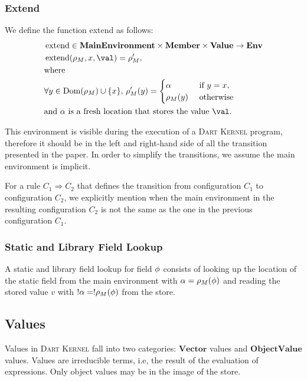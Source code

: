 \documentclass[a4paper,oneside,fleqn]{article}
\newcommand{\kernel}{\textsc{Dart Kernel}}
\DeclareMathOperator{\dom}{Dom} %
\DeclareMathOperator{\extend}{extend}
\newcommand{\denv}{\mathbf{Env}}
\newcommand{\dval}{\mathbf{Value}}
\newcommand{\dobjval}{\mathbf{ObjectValue}}
\newcommand{\dvector}{\mathbf{Vector}}
\newcommand{\dmember}{\mathbf{Member}}
\begin{document}
\subsubsection{Extend}
We define the function extend as follows:
\begin{align*}
    &\extend \in \dmainenv \times \dmember \times \dval \rightarrow \denv\\
    &\extend(\mainenv, x, \val) = \mainenv',\\
    &\text{where }\\
    &\forall y \in \dom(\mainenv) \cup \{x\},\,\mainenv'(y) =\begin{cases}
        \loc &\text{ if } y = x,\\
        \mainenv(y) &\text{ otherwise}\\
    \end{cases}\\
    &\text{and $\loc$ is a fresh location that stores the value $\val$.}
\end{align*}

This environment is visible during the execution of a \kernel{} program, therefore it should be in the left and right-hand side of all the transition presented in the paper.
In order to simplify the transitions, we assume the main environment is implicit.

For a rule $C_1 \Rightarrow C_2$ that defines the transition from configuration $C_1$ to configuration $C_2$, we explicitly mention when the main environment in the resulting configuration $C_2$ is not the same as the one in the previous configuration $C_1$.

\subsubsection{Static and Library Field Lookup}
\label{subsubsec:static-field-lookup}

A static and library field lookup for field $\phi$ consists of looking up the location of the static field from the main environment with $\alpha = \rho_{M}(\phi)$ and reading the stored value $v$ with $!\alpha = !\rho_{M}(\phi)$ from the store.


\subsection{Values}
\label{sec:values}

Values in \kernel{} fall into two categories: $\dvector$ values and $\dobjval$ values.
Values are irreducible terms, i.e, the result of the evaluation of expressions.
Only object values may be in the image of the store.
\end{document}
